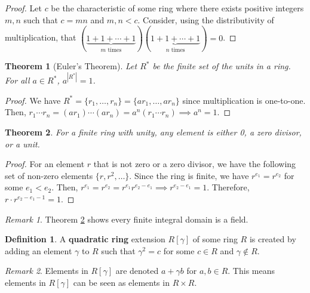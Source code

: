 \documentclass[11pt]{article}
\newtheorem{theorem}{Theorem}[definition]
\theoremstyle{definition}
\newtheorem{definition}{Definition}[section]
\theoremstyle{remark}
\newtheorem{remark}{Remark}[definition]
\begin{document}
\begin{proof}
    Let $c$ be the characteristic of some ring where there exists positive
    integers $m,n$ such that $c=mn$ and $m,n<c$.
    Consider, using the distributivity of multiplication, that
    $(\underbrace{1+1+\cdots+1}_{m\text{ times}})(\underbrace{1+1+\cdots+1}_{n\text{ times}})=0$.
\end{proof}

\begin{theorem}[Euler's Theorem]
    Let $R^*$ be the finite set of the units in a ring.
    For all $a\in R^*$, $a^{|R^*|}=1$.
\end{theorem}

\begin{proof}
    We have $R^*=\{r_1,\dots,r_n\}=\{ar_1,\dots,ar_n\}$ since multiplication
    is one-to-one.
    Then, $r_1\cdots r_n=(ar_1)\cdots (ar_n)=a^n(r_1\cdots r_n)\implies a^n=1$.
\end{proof}

\begin{theorem}
    \label{thm:finite ring with unity}
    For a finite ring with unity, any element is either 0, a zero divisor, or a
    unit.
\end{theorem}

\begin{proof}
    For an element $r$ that is not zero or a zero divisor, we have the
    following set of non-zero elements $\{r,r^2,\dots\}$.
    Since the ring is finite, we have $r^{e_1}=r^{e_2}$ for some $e_1<e_2$.
    Then, $r^{e_1}=r^{e_2}=r^{e_1}r^{e_2-e_1}\implies r^{e_2-e_1}=1$.
    Therefore, $r\cdot r^{e_2-e_1-1}=1$.
\end{proof}

\begin{remark}
    Theorem \ref{thm:finite ring with unity} shows every finite integral domain
    is a field.
\end{remark}


\begin{definition}
    A \textbf{quadratic ring} extension $R[\gamma]$ of some ring $R$ is created
    by adding an element $\gamma$ to $R$ such that $\gamma^2=c$ for some
    $c\in R$ and $\gamma\notin R$.
\end{definition}

\begin{remark}
    Elements in $R[\gamma]$ are denoted $a+\gamma b$ for $a,b\in R$.
    This means elements in $R[\gamma]$ can be seen as elements in $R\times R$.
\end{remark}
\end{document}
